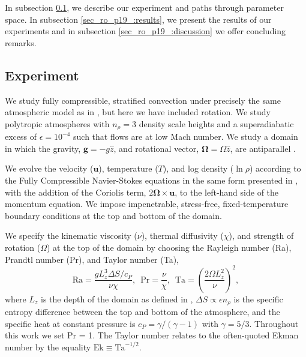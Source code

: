 In subsection  \ref{sec_ro_p19_:experiment}, we describe our experiment and paths through parameter space. 
In subsection \ref{sec_ro_p19_:results}, we present the results of our experiments and in subsection \ref{sec_ro_p19_:discussion} we offer concluding remarks.

\subsection{Experiment} 
\label{sec_ro_p19_:experiment}
We study fully compressible, stratified 
convection under precisely the same atmospheric model
as in \AB, but here
we have included rotation. We study polytropic atmospheres
with $n_\rho = 3$ density scale heights and a superadiabatic
excess of $\epsilon = 10^{-4}$ such that flows are at low Mach number.
We study a domain in which the
gravity, $\bm{g} = -g\hat{z}$, and rotational vector, $\bm{\Omega} = \Omega \hat{z}$, 
are antiparallel \citep[as in e.g.,][]{julien&all1996, brummell&all1996}.

We evolve the velocity ($\bm{u}$), temperature ($T$), 
and log density ($\ln\rho$) according to the Fully Compressible Navier-Stokes equations
in the same form presented in \AB, with the
addition of the Coriolis term, \mbox{$2\bm{\Omega}\times\bm{u}$}, to the left-hand side
of the momentum equation. 
We impose impenetrable, stress-free, fixed-temperature boundary conditions at the top and bottom of the domain.


We specify the kinematic viscosity ($\nu$), thermal diffusivity ($\chi$), and strength of
rotation ($\Omega$) at the top of the domain by choosing the Rayleigh number 
(Ra), Prandtl number (Pr), and Taylor number (Ta),
\begin{equation}
    \text{Ra} = \frac{g L_z^3 \Delta S / c_P}{\nu \chi}, \,\,\,
    \text{Pr} = \frac{\nu}{\chi}, \,\,\,
    \text{Ta} = \left(\frac{2 \Omega L_z^2}{\nu}\right)^2,
	\label{eqn:ro_p19_input_parameters}
\end{equation}
where $L_z$ is the depth of the domain as defined in \AB, 
$\Delta S \propto \epsilon n_\rho$ is the specific entropy difference between
the top and bottom of the atmosphere, and the specific heat at constant pressure is $c_P = \gamma/(\gamma-1)$
with $\gamma = 5/3$.
Throughout this work we set Pr = 1. The Taylor number relates to the often-quoted
Ekman number by the equality $\text{Ek} \equiv \text{Ta}^{-1/2}$.

